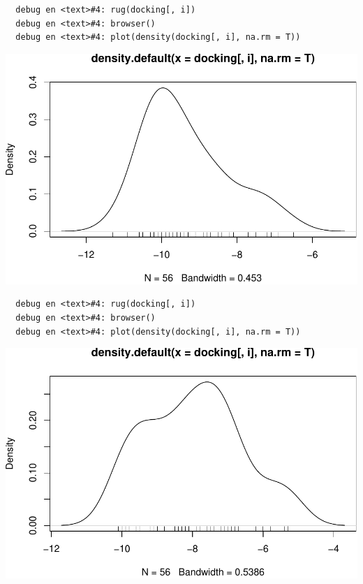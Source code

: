\documentclass[12pt,twoside]{reedthesis}
\begin{document}
  \begin{verbatim}
  debug en <text>#4: rug(docking[, i])
  debug en <text>#4: browser()
  debug en <text>#4: plot(density(docking[, i], na.rm = T))
  \end{verbatim}
  
  \begin{center}\includegraphics{tesis_files/figure-latex/johan-15} \end{center}
  
  \begin{verbatim}
  debug en <text>#4: rug(docking[, i])
  debug en <text>#4: browser()
  debug en <text>#4: plot(density(docking[, i], na.rm = T))
  \end{verbatim}
  
  \begin{center}\includegraphics{tesis_files/figure-latex/johan-16} \end{center}
  
\end{document}
